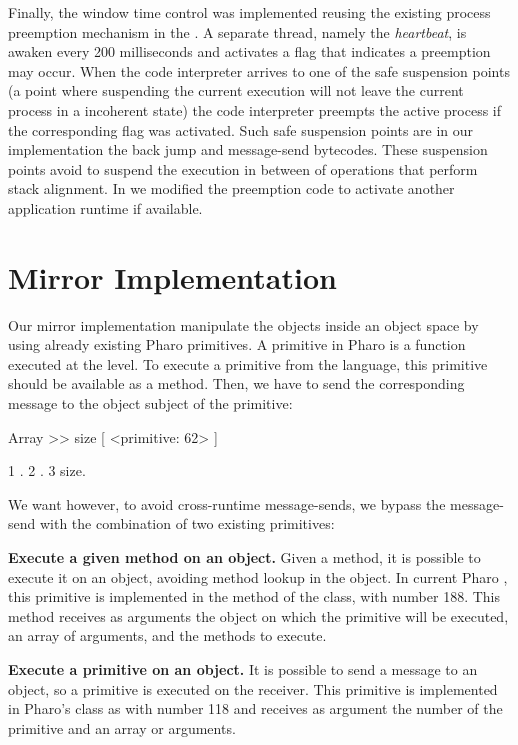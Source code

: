 Finally, the window time control was implemented reusing the existing process preemption mechanism in the \VM. A separate thread, namely the \emph{heartbeat}, is awaken every 200 milliseconds and activates a flag that indicates a preemption may occur. When the \VM code interpreter arrives to one of the safe suspension points (\ie a point where suspending the current execution will not leave the current process in a incoherent state) the code interpreter preempts the active process if the corresponding flag was activated. Such safe suspension points are in our implementation the back jump and message-send bytecodes. These suspension points avoid to suspend the execution in between of \eg operations that perform stack alignment. In \Vtt we modified the preemption code to activate another application runtime if available.

\section{Mirror Implementation}\label{sec:implementation_mirrors}

Our mirror implementation manipulate the objects inside an object space by using already existing Pharo \VM primitives. A primitive in Pharo is a function executed at the \VM level. To execute a primitive from the language, this primitive should be available as a method. Then, we have to send the corresponding message to the object subject of the primitive:

\begin{code}
Array >> size [
    <primitive: 62>
]

{1 . 2 . 3} size.
\end{code}

We want however, to avoid cross-runtime message-sends, we bypass the message-send with the combination of two existing primitives:
\begin{description}
	\item \textbf{Execute a given method on an object.} Given a method, it is possible to execute it on an object, avoiding method lookup in the object. In current Pharo \VM, this primitive is implemented in the method \textbf{} of the  class, with number 188. This method receives as arguments the object on which the primitive will be executed, an array of arguments, and the methods to execute.
	\item \textbf{Execute a primitive on an object.} It is possible to send a message to an object, so a primitive is executed on the receiver. This primitive is implemented in Pharo's  class as \textbf{} with number 118 and receives as argument the number of the primitive and an array or arguments.
\end{description}

